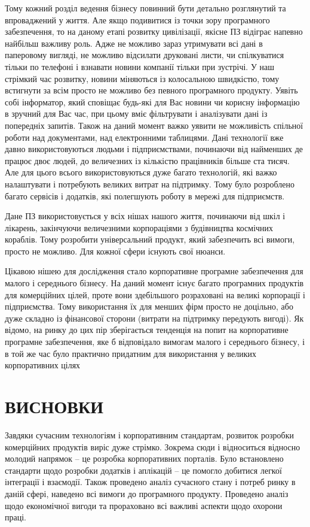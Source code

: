 Тому кожний розділ ведення бізнесу повинний бути детально розглянутий та впроваджений у життя. 
Але якщо подивитися із точки зору програмного забезпечення, то на даному етапі розвитку цивілізації, якісне ПЗ відіграє напевно найбільш важливу роль. 
Адже не можливо зараз утримувати всі дані в паперовому вигляді, не можливо відсилати друковані листи, чи спілкуватися тільки по телефоні і взнавати новини компанії тільки при зустрічі. 
У наш стрімкий час розвитку, новини міняються із колосальною швидкістю, тому встигнути за всім просто не можливо без певного програмного продукту. 
Уявіть собі інформатор, який сповіщає будь-які для Вас новини чи корисну інформацію в зручний для Вас час, при цьому вміє фільтрувати і аналізувати дані із попередніх запитів. 
Також на даний момент важко уявити не можливість спільної роботи над документами, над електронними таблицями. 
Дані технології вже давно використовуються людьми і підприємствами, починаючи від найменших де працює двоє людей, до величезних із кількістю працівників більше ста тисяч. 
Але для цього всього використовуються дуже багато технологій, які важко налаштувати і потребують великих витрат на підтримку.
Тому було розроблено багато сервісів і додатків, які полегшують роботу в мережі для підприємств.
\par Дане ПЗ використовується у всіх нішах нашого життя, починаючи від шкіл і лікарень, закінчуючи величезними корпораціями з будівництва космічних кораблів. 
Тому розробити універсальний продукт, який забезпечить всі вимоги, просто не можливо. 
Для кожної сфери існують свої нюанси.
\par Цікавою нішею для дослідження стало корпоративне програмне забезпечення для малого і середнього бізнесу.
 На даний момент існує багато програмних продуктів для комерційних цілей, проте вони здебільшого розраховані на великі корпорації і підприємства.
Тому використання їх для менших фірм просто не доцільно, або дуже складно із фінансової сторони (витрати на підтримку передують вигоді).
Як відомо, на ринку до цих пір зберігається тенденція на попит на корпоративне програмне забезпечення, яке б відповідало вимогам малого і середнього бізнесу, і в той же час було практично придатним для використання у великих корпоративних цілях









\section*{ВИСНОВКИ}
Завдяки сучасним технологіям і корпоративним стандартам, розвиток розробки комерційних продуктів виріс дуже стрімко. 
Зокрема сюди і відноситься відносно молодий напрямок -- це розробка корпоративних порталів. 
Було встановлено стандарти щодо розробки додатків і аплікацій -- це помогло добитися легкої інтеграції і взаємодії. 
Також проведено аналіз сучасного стану і потреб ринку в даній сфері, наведено всі вимоги до програмного продукту.
Проведено аналіз щодо економічної вигоди та прораховано всі важливі аспекти щодо охорони праці.



